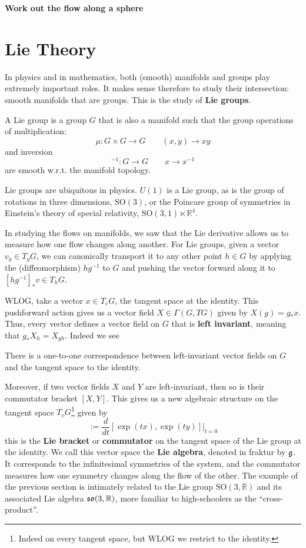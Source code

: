 	\textbf{Work out the flow along a sphere}
	
	
	\section{Lie Theory} %
	\label{sec:lie_theory}
		
		In physics and in mathematics, both (smooth) manifolds and groups play extremely important roles. It makes sense therefore to study their intersection: smooth manifolds that are groups. This is the study of \textbf{Lie groups}.
		\begin{defn}
			A Lie group is a group $G$ that is also a manifold such that the group operations of multiplication:
			$$\mu: G \times G \to G \qquad (x, y) \to xy$$
			and inversion 
			$$^{-1} : G \to G \qquad x \to x^{-1}$$
			are smooth w.r.t. the manifold topology.
		\end{defn}
		
		Lie groups are ubiquitous in physics. $U(1)$ is a Lie group, as is the group of rotations in three dimensions, $\mathrm{SO}(3)$, or the Poincare group of symmetries in Einstein's theory of special relativity, $\mathrm{SO}(3, 1) \ltimes \mathbb R^4$.
		
		In studying the flows on manifolds, we saw that the Lie derivative allows us to measure how one flow changes along another. For Lie groups, given a vector $v_g \in T_g G$, we can canonically transport it to any other point $h \in G$ by applying the (diffeomorphism) $h g^{-1}$ to $G$ and pushing the vector forward along it to $[h g^{-1}]_* v \in T_{h} G$.
		
		WLOG, take a vector $x \in T_e G$, the tangent space at the identity. This pushforward action gives us a vector field $X \in \Gamma(G, TG)$ given by $X(g) = g_* x$. Thus, every vector defines a vector field on $G$ that is \textbf{left invariant}, meaning that $g_* X_h = X_{gh}$. Indeed we see
		\begin{prop}
			There is a one-to-one correspondence between left-invariant vector fields on $G$ and the tangent space to the identity. 
		\end{prop}
		Moreover, if two vector fields $X$ and $Y$ are left-invariant, then so is their commutator bracket $[X, Y]$. This gives us a new algebraic structure on the tangent space $T_e G$\footnote{Indeed on every tangent space, but WLOG we restrict to the identity.} given by 
		\begin{equation}
			[x, y] := \frac{d}{dt} [\exp(tx), \exp(ty)] |_{t = 0}
		\end{equation}
		this is the \textbf{Lie bracket} or \textbf{commutator} on the tangent space of the Lie group at the identity. We call this vector space the \textbf{Lie algebra}, denoted in fraktur by $\frak g$. It corresponds to the infinitesimal symmetries of the system, and the commutator measures how one symmetry changes along the flow of the other. The example of the previous section is intimately related to the Lie group $\mathrm{SO}(3, \mathbb R)$ and its associated Lie algebra $\frak{so}(3, \mathbb R)$, more familiar to high-schoolers as the ``cross-product''.
		
